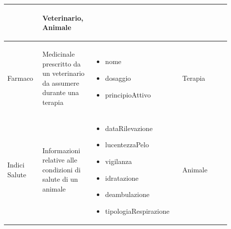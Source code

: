 \documentclass[12pt,a4paper]{article}
\begin{document}
\begin{center}
\begin{longtable}{|p{0.14\linewidth}|p{0.20\linewidth}|p{0.36\linewidth}|p{0.20\linewidth}|}
\begin{itemize}
					\end{itemize}
					& \begin{flushleft}\vspace{-25pt} Veterinario, Animale \end{flushleft} \\ 

\hline
Farmaco				 	& \begin{flushleft}\vspace{-25pt} Medicinale prescritto da un veterinario da assumere durante una terapia \end{flushleft}
					& \begin{itemize}
						\setlength{\itemindent}{-1em}
						\vspace{-25pt}
						\setlength\itemsep{-0.25em}
						\item nome
						\item dosaggio
						\item principioAttivo
					\end{itemize}
					& \begin{flushleft}\vspace{-25pt} Terapia \end{flushleft} \\ 

\hline
Indici Salute				 	& \begin{flushleft}\vspace{-25pt} Informazioni relative alle condizioni di salute di un animale \end{flushleft}
					& \begin{itemize}
						\setlength{\itemindent}{-1em}
						\vspace{-25pt}
						\setlength\itemsep{-0.25em}
						\item dataRilevazione
						\item lucentezzaPelo
						\item vigilanza
						\item idratazione
						\item deambulazione
						\item tipologiaRespirazione
						
					\end{itemize}
					& \begin{flushleft}\vspace{-25pt} Animale \end{flushleft} \\ 


\end{longtable}
\end{center}
\end{document}
